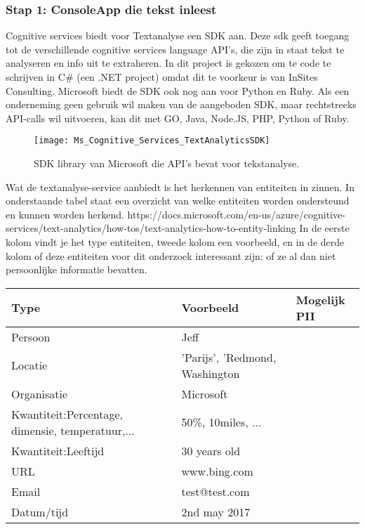\subsubsection{Stap 1: ConsoleApp die tekst inleest}
Cognitive services biedt voor Textanalyse een SDK aan.
 Deze sdk geeft toegang tot de verschillende cognitive services language API's, die zijn in staat tekst te analyseren en info uit te extraheren. In dit project is gekozen om te code te schrijven in C\# (een .NET project) omdat dit te voorkeur is van InSites Consulting. Microsoft biedt de SDK ook nog aan voor Python en Ruby. Als een onderneming geen gebruik wil maken van de aangeboden SDK, maar rechtstreeks API-calls wil uitvoeren, kan dit met GO, Java, Node.JS, PHP, Python of Ruby.\\

\begin{figure}[h]
	\centering
	\texttt{[image: Ms\_Cognitive\_Services\_TextAnalyticsSDK]}
	\label{fig:textanalyticsSDK}
	\caption{SDK library van Microsoft die API's bevat voor tekstanalyse.}
\end{figure}

Wat de textanalyse-service aanbiedt is het herkennen van entiteiten in zinnen. In onderstaande tabel staat een overzicht van welke entiteiten worden ondersteund en kunnen worden herkend. 
https://docs.microsoft.com/en-us/azure/cognitive-services/text-analytics/how-tos/text-analytics-how-to-entity-linking
In de eerste kolom vindt je het type entiteiten, tweede kolom een voorbeeld, en in de derde kolom of deze entiteiten voor dit onderzoek interessant zijn: of ze al dan niet persoonlijke informatie bevatten. 

	\begin{tabularx}{\linewidth}{ |X|l|l| } 
	\hline
	Type & Voorbeeld & Mogelijk PII \\ [0.5ex]
	
	\hline\hline
	Persoon & Jeff & \checkmark \\ \hline 
	Locatie & 'Parijs', 'Redmond, Washington & \checkmark \\ \hline  
	Organisatie & Microsoft & \checkmark \\ \hline 
	Kwantiteit:Percentage, dimensie, temperatuur,... & 50\%, 10miles, ... & \\ \hline 
	Kwantiteit:Leeftijd & 30 years old & \checkmark \\ \hline 
	URL & www.bing.com & \checkmark \\ \hline 
	Email & test@test.com & \checkmark \\ \hline 
	Datum/tijd & 2nd may 2017 & \\ \hline 
	
	\hline
	
\end{tabularx}


